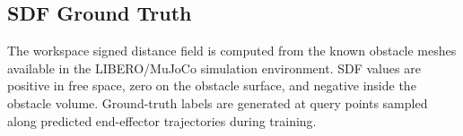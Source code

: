 \subsection{SDF Ground Truth}

The workspace signed distance field is computed from the known obstacle meshes available in the LIBERO/MuJoCo simulation environment. SDF values are positive in free space, zero on the obstacle surface, and negative inside the obstacle volume. Ground-truth labels are generated at query points sampled along predicted end-effector trajectories during training.